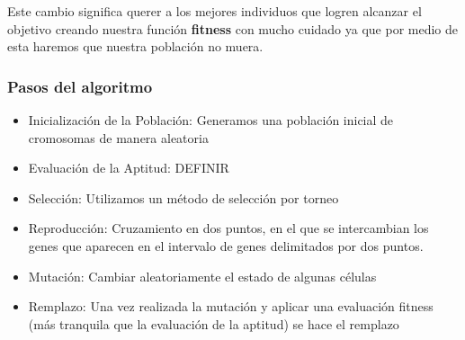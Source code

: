 Este cambio significa querer a los mejores individuos que logren alcanzar el objetivo creando 
nuestra función \textbf{fitness} con mucho cuidado ya que por medio de esta  haremos que 
nuestra población no muera.\\ 


\subsubsection*{Pasos del algoritmo}


\begin{itemize}
    \item Inicialización de la Población: Generamos una población inicial de cromosomas de manera aleatoria
    \item Evaluación de la Aptitud: DEFINIR
    \item Selección: Utilizamos un método de selección por torneo
    \item Reproducción: Cruzamiento en dos puntos, en el que se intercambian los genes que aparecen en el intervalo de genes delimitados por dos puntos.
    \item Mutación: Cambiar aleatoriamente el estado de algunas células
    \item Remplazo: Una vez realizada la mutación y aplicar una evaluación fitness (más tranquila que la evaluación de la aptitud) se hace el remplazo
\end{itemize}